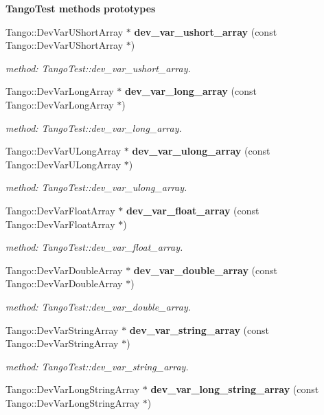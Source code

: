 \begin{Indent}{\bf Tango\-Test methods prototypes}
\begin{CompactItemize}
Tango::Dev\-Var\-UShort\-Array $\ast$ {\bf dev\_\-var\_\-ushort\_\-array} (const Tango::Dev\-Var\-UShort\-Array $\ast$)
\begin{CompactList}\small\item\em method: Tango\-Test::dev\_\-var\_\-ushort\_\-array.\item\end{CompactList}\item 
Tango::Dev\-Var\-Long\-Array $\ast$ {\bf dev\_\-var\_\-long\_\-array} (const Tango::Dev\-Var\-Long\-Array $\ast$)
\begin{CompactList}\small\item\em method: Tango\-Test::dev\_\-var\_\-long\_\-array.\item\end{CompactList}\item 
Tango::Dev\-Var\-ULong\-Array $\ast$ {\bf dev\_\-var\_\-ulong\_\-array} (const Tango::Dev\-Var\-ULong\-Array $\ast$)
\begin{CompactList}\small\item\em method: Tango\-Test::dev\_\-var\_\-ulong\_\-array.\item\end{CompactList}\item 
Tango::Dev\-Var\-Float\-Array $\ast$ {\bf dev\_\-var\_\-float\_\-array} (const Tango::Dev\-Var\-Float\-Array $\ast$)
\begin{CompactList}\small\item\em method: Tango\-Test::dev\_\-var\_\-float\_\-array.\item\end{CompactList}\item 
Tango::Dev\-Var\-Double\-Array $\ast$ {\bf dev\_\-var\_\-double\_\-array} (const Tango::Dev\-Var\-Double\-Array $\ast$)
\begin{CompactList}\small\item\em method: Tango\-Test::dev\_\-var\_\-double\_\-array.\item\end{CompactList}\item 
Tango::Dev\-Var\-String\-Array $\ast$ {\bf dev\_\-var\_\-string\_\-array} (const Tango::Dev\-Var\-String\-Array $\ast$)
\begin{CompactList}\small\item\em method: Tango\-Test::dev\_\-var\_\-string\_\-array.\item\end{CompactList}\item 
Tango::Dev\-Var\-Long\-String\-Array $\ast$ {\bf dev\_\-var\_\-long\_\-string\_\-array} (const Tango::Dev\-Var\-Long\-String\-Array $\ast$)

\end{CompactItemize}
\end{Indent}
